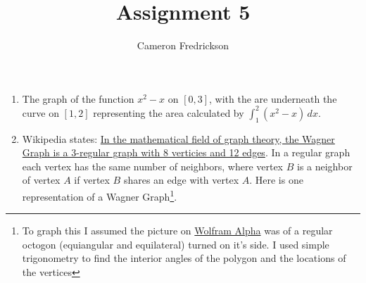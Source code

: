 \documentclass{article}
\title{Assignment 5}
\author{Cameron Fredrickson}
\date{}
\begin{document}
\maketitle

\begin{enumerate}
    \item The graph of the function \(x^2 - x\) on \(\left[0, 3\right]\), with the are underneath the curve on \(\left[1, 2\right]\) representing the area calculated by \(\int_1^2 \left(x^2 - x \right) \, dx\).
    \begin{center}
    \end{center}

    \newpage

    \item Wikipedia states: \href{https://en.wikipedia.org/wiki/Wagner_graph}{In the mathematical field of graph theory, the Wagner Graph is a 3-regular graph with 8 verticies and 12 edges}. In a regular graph each vertex has the same number of neighbors, where vertex $B$ is a neighbor of vertex $A$ if vertex $B$ shares an edge with vertex $A$. Here is one representation of a Wagner Graph\footnote{To graph this I assumed the picture on \href{http://mathworld.wolfram.com/WagnerGraph.html}{Wolfram Alpha} was of a regular octogon (equiangular and equilateral) turned on it's side. I used simple trigonometry to find the interior angles of the polygon and the locations of the vertices}.
    \begin{center}
    \end{center}

\end{enumerate}
\end{document}
